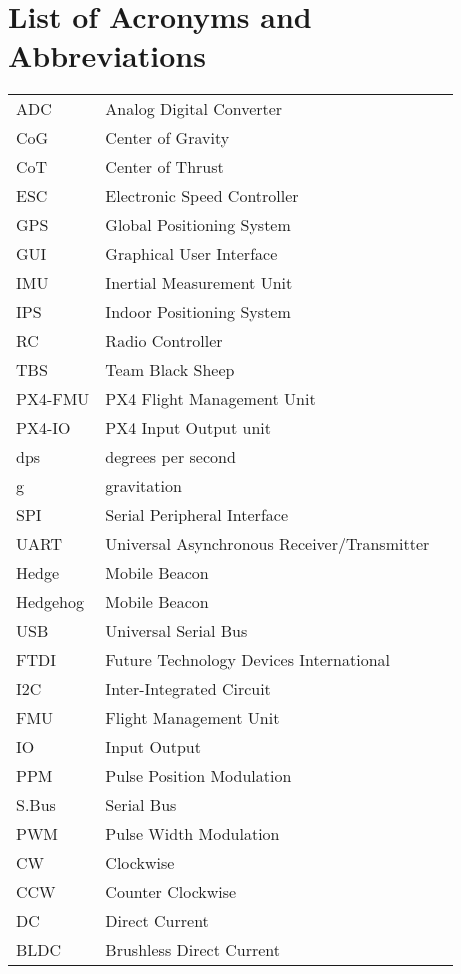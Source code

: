 \chapter*{List of Acronyms and Abbreviations}  


\begin{table}[!h]
\begin{tabular}{l l r}
ADC			&Analog Digital Converter\\	
CoG			&Center of Gravity\\
CoT			&Center of Thrust\\
ESC			&Electronic Speed Controller\\
GPS			&Global Positioning System\\
GUI			&Graphical User Interface\\
IMU			&Inertial Measurement Unit\\
IPS 		&Indoor Positioning System\\
RC			&Radio Controller\\
TBS			&Team Black Sheep\\
PX4-FMU		&PX4 Flight Management Unit\\
PX4-IO		&PX4 Input Output unit\\
dps			&degrees per second\\
g			&gravitation\\
SPI			&Serial Peripheral Interface\\
UART		&Universal Asynchronous Receiver/Transmitter\\
Hedge		&Mobile Beacon\\
Hedgehog	&Mobile Beacon\\
USB			&Universal Serial Bus\\
FTDI		&Future Technology Devices International\\
I2C			&Inter-Integrated Circuit\\
FMU			&Flight Management Unit\\
IO			&Input Output\\
PPM			&Pulse Position Modulation\\
S.Bus		&Serial Bus\\
PWM			&Pulse Width Modulation\\
CW			&Clockwise\\
CCW			&Counter Clockwise\\
DC			&Direct Current\\
BLDC		&Brushless Direct Current\\

\end{tabular}
\end{table}
